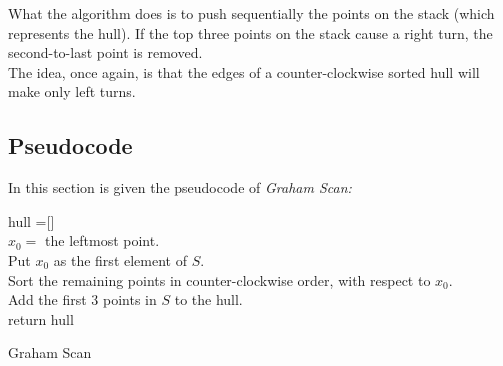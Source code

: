 \documentclass[
12pt,
a4paper,
oneside,
headinclude,
footinclude]{report}
\theoremstyle{definition} %
\begin{document}
What the algorithm does is to push sequentially the points on the stack (which represents the hull). If the top three points on the stack cause a right turn, the second-to-last point is removed. \\
The idea, once again, is that the edges of a counter-clockwise sorted hull will make only left turns.
\subsection{Pseudocode}
In this section is given the pseudocode of \textit{Graham Scan:} \cite{Preparata:1985:CGI:4333}\\


\begin{algorithm}[H]
	\DontPrintSemicolon
	\SetAlgoVlined
	hull =[]\\
	$x_0 =$ the leftmost point.\\
	Put $x_0$ as the first element of $S$.\\
	Sort the remaining points in counter-clockwise order, with respect to $x_0$.\\
	Add the first 3 points in $S$ to the hull. \\
	
	
	return hull
	\caption{Graham Scan}
\end{algorithm}

\newpage
\end{document}
